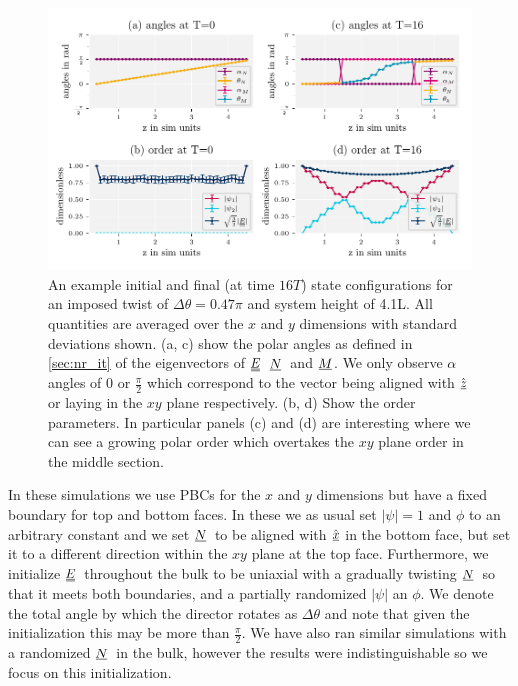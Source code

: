 \documentclass[12pt]{article}
\newcommand{\suf}[2]{\stackunder[0.5pt]{\stackunder[1pt]{\ensuremath{#1}}{\rule{\widthof{\ensuremath{#2}}*\real{0.9}}{.1ex}}}{}}
\newcommand{\duf}[2]{\stackunder[0.5pt]{\stackunder[0.8pt]{\stackunder[1pt]{\ensuremath{#1}}{\rule{\widthof{\ensuremath{#2}}*\real{0.9}}{.1ex}}}{\rule{\widthof{\ensuremath{#2}}*\real{0.9}}{.1ex}}}{}}
\newcommand{\su}[1]{\suf{#1}{#1}}
\newcommand{\du}[1]{\duf{#1}{#1}}
\newcommand{\NN}{\ensuremath{\su{N}}}
\newcommand{\MM}{\ensuremath{\su{M}}}
\newcommand{\EE}{\ensuremath{\du{E}}}
\begin{document}
        \begin{figure}[t!]
            \begin{center}
                \includegraphics{figures/data_plots/twist_angleseg.pdf}
            \end{center}
            \caption{
                An example initial and final (at time $16\si{T}$) state configurations for an imposed twist of $\Delta\theta=0.47\pi$ and system height of 4.1\si{L}.
                All quantities are averaged over the $x$ and $y$ dimensions with standard deviations shown.
                (a, c) show the polar angles as defined in \cref{sec:nr_it} of the eigenvectors of \EE\ \NN\ and \MM.
                We only observe $\alpha$ angles of 0 or $\frac{\pi}{2}$ which correspond to the vector being aligned with $\hat{\su{z}}$ or laying in the $xy$ plane respectively.
                (b, d) Show the order parameters.
                In particular panels (c) and (d) are interesting where we can see a growing polar order which overtakes the $xy$ plane order in the middle section.
            }\label{fig:twist_angleseg}
        \end{figure}

        In these simulations we use PBCs for the $x$ and $y$ dimensions but have a fixed boundary for top and bottom faces.
        In these we as usual set $|\psi|=1$ and $\phi$ to an arbitrary constant and we set \NN\ to be aligned with $\hat{\su{x}}$ in the bottom face, but set it to a different direction within the $xy$ plane at the top face.
        Furthermore, we initialize \EE\ throughout the bulk to be uniaxial with a gradually twisting \NN\ so that it meets both boundaries, and a partially randomized $|\psi|$ an $\phi$.
        We denote the total angle by which the director rotates as $\Delta\theta$ and note that given the initialization this may be more than $\frac{\pi}{2}$.
        We have also ran similar simulations with a randomized \NN\ in the bulk, however the results were indistinguishable so we focus on this initialization.
        
\end{document}
